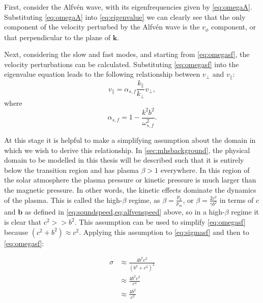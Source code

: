 \documentclass[a4paper,12pt,fourier,authoryear,custommargin]{Classes/PhDThesisPSnPDF}
\renewcommand{\vec}{\mathbf}
\begin{document}
First, consider the Alfv\'en wave, with its eigenfrequencies given by \cref{eq:omegaA}.
Substituting \cref{eq:omegaA} into \cref{eq:eigenvalue} we can clearly see that the only component of the velocity perturbed by the Alfv\'en wave is the $v_\phi$ component, or that perpendicular to the plane of $\vec{k}$.

Next, considering the slow and fast modes, and starting from \cref{eq:omegasf}, the velocity perturbations can be calculated.
Substituting \cref{eq:omegasf} into the eigenvalue equation leads to the following relationship between $v_\perp$ and $v_\parallel$:
\begin{equation}
    v_\parallel = \alpha_{s,f} \frac{k_\parallel}{k_\perp}v_\perp,
    \label{eq:vyvz}
\end{equation}
where
\begin{equation}
    \alpha_{s,f} = 1 - \frac{k^2b^2}{\omega^2_{s,f}}.
    \label{eq:alphasf}
\end{equation}

At this stage it is helpful to make a simplifying assumption about the domain in which we wish to derive this relationship.
In \cref{sec:mhsbackground}, the physical domain to be modelled in this thesis will be described such that it is entirely below the transition region and has plasma $\beta > 1$ everywhere.
In this region of the solar atmosphere the plasma pressure or kinetic pressure is much larger than the magnetic pressure.
In other words, the kinetic effects dominate the dynamics of the plasma.
This is called the high-$\beta$ regime, as $\displaystyle\beta = \frac{p_k}{p_m}$, or $\displaystyle\beta = \frac{2c^2}{\gamma b^2}$ in terms of $c$ and $\vec{b}$ as defined in \cref{eq:soundspeed,eq:alfvenspeed} above, so in a high-$\beta$ regime it is clear that $c^2 >> b^2$.
This assumption can be used to simplify \cref{eq:omegasf} because $(c^2 + b^2) \approx c^2$.
Applying this assumption to \cref{eq:sigmasf} and then to \cref{eq:omegasf}:

\begin{align}
    \sigma &\approx \frac{4b^2c^2}{(b^2+c^2)^2}\\
           &\approx \frac{4b^2c^2}{c^4}\\
           &\approx \frac{4b^2}{c^2}
\end{align}
\end{document}
